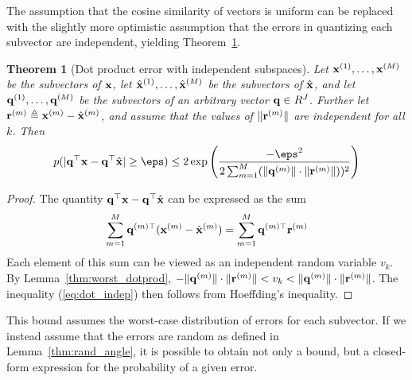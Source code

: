 \documentclass[]{article}
\newtheorem{theorem}{Theorem}[section]
\begin{document}

The assumption that the cosine similarity of vectors is uniform can be replaced with the slightly more optimistic assumption that the errors in quantizing each subvector are independent, yielding Theorem~\ref{thm:dot_indep}.

\begin{theorem}[Dot product error with independent subspaces] \label{thm:dot_indep}
Let $\mathbf{x}^{(1)},\ldots,\mathbf{x}^{(M)}$ be the subvectors of $\mathbf{x}$, let $\hat{\mathbf{x}}^{(1)},\ldots,\hat{\mathbf{x}}^{(M)}$ be the subvectors of $\hat{\mathbf{x}}$, and let $\mathbf{q}^{(1)},\ldots,\mathbf{q}^{(M)}$ be the subvectors of an arbitrary vector $\mathbf{q} \in R^J$. Further let $\mathbf{r}^{(m)} \triangleq \mathbf{x}^{(m)} - \hat{\mathbf{x}}^{(m)}$, and assume that the values of $\lVert \mathbf{r}^{(m)} \rVert$ are independent for all $k$. Then %
\begin{align} \label{eq:dot_indep}
    p(\abs{\q^\top \x - \q^\top \xhat} \ge \eps) \le 2\exp \left( \frac{-\eps^2}{
        2 \sum_{m=1}^M (\norm{\q^{(m)}} \cdot \norm{ \r^{(m)} }))^2
    }\right)
\end{align}
\end{theorem}

\begin{proof}
The quantity $\mathbf{q}^\top \mathbf{x} - \mathbf{q}^\top \hat{\mathbf{x}}$ can be expressed as the sum
\begin{align}
    \sum_{m=1}^M \mathbf{q}^{(m)\top} (\mathbf{x}^{(m)} - \hat{\mathbf{x}}^{(m)}) = \sum_{m=1}^M \mathbf{q}^{(m)\top} \mathbf{r}^{(m)}
\end{align}
Each element of this sum can be viewed as an independent random variable $v_k$. By Lemma~\ref{thm:worst_dotprod}, $-\lVert\mathbf{q}^{(m)}\rVert \cdot \lVert\mathbf{r}^{(m)}\rVert < v_k < \lVert\mathbf{q}^{(m)}\rVert \cdot \lVert\mathbf{r}^{(m)}\rVert$. The inequality (\ref{eq:dot_indep}) then follows from Hoeffding's inequality.
\end{proof}

This bound assumes the worst-case distribution of errors for each subvector. If we instead assume that the errors are random as defined in Lemma~\ref{thm:rand_angle}, it is possible to obtain not only a bound, but a closed-form expression for the probability of a given error.
\end{document}
